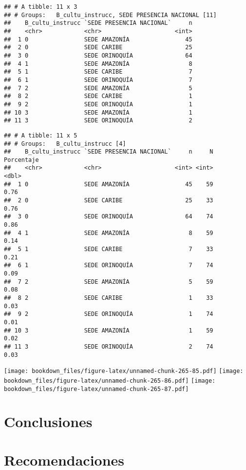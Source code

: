 \documentclass[]{article}
\theoremstyle{definition}
\theoremstyle{definition}
\theoremstyle{definition}
\theoremstyle{remark}
\begin{document}
\begin{verbatim}
## # A tibble: 11 x 3
## # Groups:   B_cultu_instrucc, SEDE PRESENCIA NACIONAL [11]
##    B_cultu_instrucc `SEDE PRESENCIA NACIONAL`     n
##    <chr>            <chr>                     <int>
##  1 0                SEDE AMAZONÍA                45
##  2 0                SEDE CARIBE                  25
##  3 0                SEDE ORINOQUÍA               64
##  4 1                SEDE AMAZONÍA                 8
##  5 1                SEDE CARIBE                   7
##  6 1                SEDE ORINOQUÍA                7
##  7 2                SEDE AMAZONÍA                 5
##  8 2                SEDE CARIBE                   1
##  9 2                SEDE ORINOQUÍA                1
## 10 3                SEDE AMAZONÍA                 1
## 11 3                SEDE ORINOQUÍA                2
\end{verbatim}

\begin{verbatim}
## # A tibble: 11 x 5
## # Groups:   B_cultu_instrucc [4]
##    B_cultu_instrucc `SEDE PRESENCIA NACIONAL`     n     N Porcentaje
##    <chr>            <chr>                     <int> <int>      <dbl>
##  1 0                SEDE AMAZONÍA                45    59       0.76
##  2 0                SEDE CARIBE                  25    33       0.76
##  3 0                SEDE ORINOQUÍA               64    74       0.86
##  4 1                SEDE AMAZONÍA                 8    59       0.14
##  5 1                SEDE CARIBE                   7    33       0.21
##  6 1                SEDE ORINOQUÍA                7    74       0.09
##  7 2                SEDE AMAZONÍA                 5    59       0.08
##  8 2                SEDE CARIBE                   1    33       0.03
##  9 2                SEDE ORINOQUÍA                1    74       0.01
## 10 3                SEDE AMAZONÍA                 1    59       0.02
## 11 3                SEDE ORINOQUÍA                2    74       0.03
\end{verbatim}

\texttt{[image: bookdown\_files/figure-latex/unnamed-chunk-265-85.pdf]}
\texttt{[image: bookdown\_files/figure-latex/unnamed-chunk-265-86.pdf]}
\texttt{[image: bookdown\_files/figure-latex/unnamed-chunk-265-87.pdf]}

\section{Conclusiones}\label{conclusiones}

\section{Recomendaciones}\label{recomendaciones}
\end{document}
